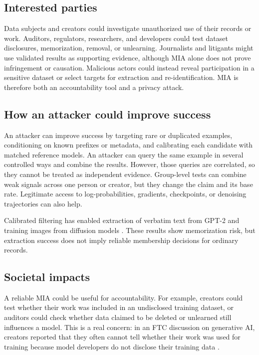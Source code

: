 \documentclass[11pt]{article}
\begin{document}
\subsection{Interested parties}

Data subjects and creators could investigate unauthorized use of their records or work.
Auditors, regulators, researchers, and developers could test dataset disclosures,
memorization, removal, or unlearning. Journalists and litigants might use validated results
as supporting evidence, although MIA alone does not prove infringement or causation.
Malicious actors could instead reveal participation in a sensitive dataset or select
targets for extraction and re-identification. MIA is therefore both an accountability tool
and a privacy attack.

\subsection{How an attacker could improve success}

An attacker can improve success by targeting rare or duplicated examples, conditioning on
known prefixes or metadata, and calibrating each candidate with matched reference models.
An attacker can query the same example in several controlled ways and combine the results. However, those queries are correlated, so they cannot be treated as independent evidence. Group-level tests can combine weak signals across one person
or creator, but they change the claim and its base rate. Legitimate access to
log-probabilities, gradients, checkpoints, or denoising trajectories can also help.

Calibrated filtering has enabled extraction of verbatim text from GPT-2
\cite{carlini2021} and training images from diffusion models \cite{carlini2023}. These
results show memorization risk, but extraction success does not imply reliable membership
decisions for ordinary records.

\subsection{Societal impacts}

A reliable MIA could be useful for accountability. For example, creators could test whether their work was included in an undisclosed training dataset, or auditors could check whether data claimed to be deleted or unlearned still influences a model. This is a real concern: in an FTC discussion on generative AI, creators reported that they often cannot tell whether their work was used for training because model developers do not disclose their training data \cite{ftc2023}.
\end{document}

